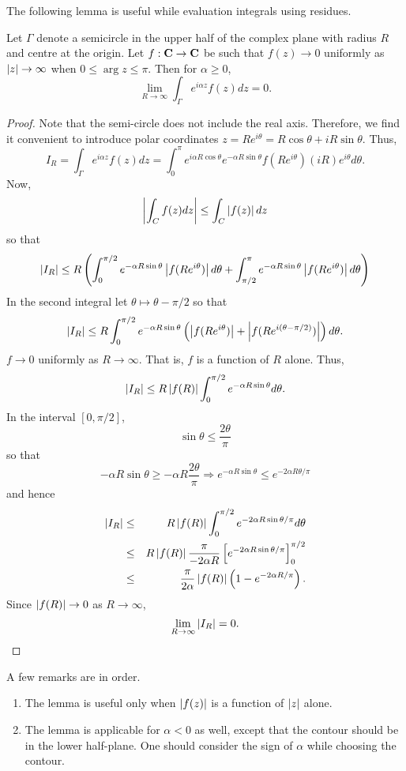 The following lemma is useful while evaluation integrals using residues.
\begin{lem}\label{c5s3l1}
Let $\Gamma$ denote a semicircle in the upper half of the complex plane with
radius $R$ and centre at the origin. Let $f:\mathbf{C} \rightarrow \mathbf{C}$ be such that
$f(z) \rightarrow 0$ uniformly as $\left\vert{z}\right\vert \rightarrow \infty$ when $0 \le \arg{z} 
\le \pi$. Then for $\alpha \ge 0$,
\[
\lim_{R \rightarrow \infty}\int_\Gamma e^{i\alpha z}f(z)dz = 0.
\]
\end{lem}
\begin{proof}
Note that the semi-circle does not include the real axis. Therefore, we find it
convenient to introduce polar coordinates $z = Re^{i\theta} = R\cos\theta + iR
\sin\theta$. Thus,
\[
I_R = \int_\Gamma e^{i\alpha z}f(z)dz = \int_0^\pi e^{i\alpha R\cos\theta}
e^{-\alpha R\sin\theta}f(Re^{i\theta})(iR)e^{i\theta}d\theta.
\]
Now,
\[
\left\vert{\int_C f(z)dz}\right\vert \le \int_C\left\vert{f(z)}\right\vert dz
\]
so that
\[
\left\vert{I_R}\right\vert \le R\left(
\int_0^{\pi/2} e^{-\alpha R\sin\theta}\left\vert{f(Re^{i\theta})}\right\vert d\theta + 
\int_{\pi/2}^\pi e^{-\alpha R\sin\theta}\left\vert{f(Re^{i\theta})}\right\vert d\theta\right)
\] 
In the second integral let $\theta \mapsto \theta - \pi/2$ so that
\[
\left\vert{I_R}\right\vert \le R\int_0^{\pi/2} e^{-\alpha R\sin\theta}\left(\left\vert{f(Re^{i\theta})}\right\vert
+ \left\vert{f(Re^{i(\theta-\pi/2)})}\right\vert\right)d\theta.
\]
$f \rightarrow 0$ uniformly as $R \rightarrow \infty$. That is, $f$ is a 
function of $R$ alone. Thus,
\[
\left\vert{I_R}\right\vert \le R\left\vert{f(R)}\right\vert \int_0^{\pi/2} e^{-\alpha R\sin\theta} d\theta.
\]
In the interval $[0, \pi/2]$, 
\[
\sin\theta \le \frac{2\theta}{\pi}
\]
so that 
\[
-\alpha R\sin\theta \ge -\alpha R \frac{2\theta}{\pi} \Rightarrow
e^{-\alpha R\sin\theta} \le e^{-2\alpha R\theta/\pi}
\]
and hence
\begin{eqnarray*}
\left\vert{I_R}\right\vert &\le& R\left\vert{f(R)}\right\vert \int_0^{\pi/2} e^{-2\alpha R\sin\theta/\pi} d\theta \\
&\le& R\left\vert{f(R)}\right\vert\frac{\pi}{-2\alpha R} \left[e^{-2\alpha R\sin\theta/\pi}\right]_0^{\pi/2} \\
&\le& \frac{\pi}{2\alpha}\left\vert{f(R)}\right\vert\left(1 - e^{-2\alpha R/\pi}\right).
\end{eqnarray*}
Since $\left\vert{f(R)}\right\vert \rightarrow 0$ as $R \rightarrow \infty$,
\[
\lim_{R \rightarrow \infty}\left\vert{I_R}\right\vert = 0.
\]
\end{proof}

A few remarks are in order.
\begin{enumerate}
\item The lemma is useful only when $\left\vert{f(z)}\right\vert$ is a function of $\left\vert{z}\right\vert$ alone.
\item The lemma is applicable for $\alpha < 0$ as well, except that the contour
should be in the lower half-plane. One should consider the sign of $\alpha$ while
choosing the contour.
\end{enumerate}

